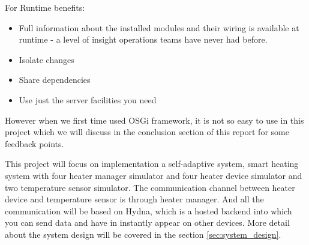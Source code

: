 \documentclass{article}
\begin{document}
\par For Runtime benefits:
\begin{itemize}
	\item Full information about the installed modules and their wiring is available at runtime - a level of insight operations teams have never had before.
	\item Isolate changes
	\item Share dependencies
	\item Use just the server facilities you need
\end{itemize}

\par However when we first time used OSGi framework, it is not so easy to use in this project which we will discuss in the conclusion section of this report for some feedback points.
\par This project will focus on implementation a self-adaptive system, smart heating system with four heater manager simulator and four heater device simulator and two temperature sensor simulator. The communication channel between heater device and temperature sensor is through heater manager. And all the communication will be based on Hydna\cite{hydna}, which is a hosted backend into which you can send data and have in instantly appear on other devices. More detail about the system design will be covered in the section \ref{sec:system_design}.







\printbibliography
\end{document}

